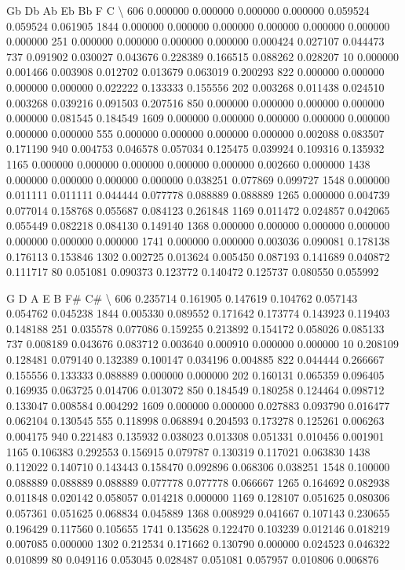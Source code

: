 \documentclass[letterpaper,10pt,english]{sphinxmanual}
\begin{document}
{\begin{sphinxVerbatim}[commandchars=\\\{\}]
            Gb        Db        Ab        Eb        Bb         F         C  \textbackslash{}
606   0.000000  0.000000  0.000000  0.000000  0.059524  0.059524  0.061905
1844  0.000000  0.000000  0.000000  0.000000  0.000000  0.000000  0.000000
251   0.000000  0.000000  0.000000  0.000000  0.000424  0.027107  0.044473
737   0.091902  0.030027  0.043676  0.228389  0.166515  0.088262  0.028207
10    0.000000  0.001466  0.003908  0.012702  0.013679  0.063019  0.200293
822   0.000000  0.000000  0.000000  0.000000  0.022222  0.133333  0.155556
202   0.003268  0.011438  0.024510  0.003268  0.039216  0.091503  0.207516
850   0.000000  0.000000  0.000000  0.000000  0.000000  0.081545  0.184549
1609  0.000000  0.000000  0.000000  0.000000  0.000000  0.000000  0.000000
555   0.000000  0.000000  0.000000  0.000000  0.002088  0.083507  0.171190
940   0.004753  0.046578  0.057034  0.125475  0.039924  0.109316  0.135932
1165  0.000000  0.000000  0.000000  0.000000  0.000000  0.002660  0.000000
1438  0.000000  0.000000  0.000000  0.000000  0.038251  0.077869  0.099727
1548  0.000000  0.011111  0.011111  0.044444  0.077778  0.088889  0.088889
1265  0.000000  0.004739  0.077014  0.158768  0.055687  0.084123  0.261848
1169  0.011472  0.024857  0.042065  0.055449  0.082218  0.084130  0.149140
1368  0.000000  0.000000  0.000000  0.000000  0.000000  0.000000  0.000000
1741  0.000000  0.000000  0.003036  0.090081  0.178138  0.176113  0.153846
1302  0.002725  0.013624  0.005450  0.087193  0.141689  0.040872  0.111717
80    0.051081  0.090373  0.123772  0.140472  0.125737  0.080550  0.055992

             G         D         A         E         B        F\#        C\#  \textbackslash{}
606   0.235714  0.161905  0.147619  0.104762  0.057143  0.054762  0.045238
1844  0.005330  0.089552  0.171642  0.173774  0.143923  0.119403  0.148188
251   0.035578  0.077086  0.159255  0.213892  0.154172  0.058026  0.085133
737   0.008189  0.043676  0.083712  0.003640  0.000910  0.000000  0.000000
10    0.208109  0.128481  0.079140  0.132389  0.100147  0.034196  0.004885
822   0.044444  0.266667  0.155556  0.133333  0.088889  0.000000  0.000000
202   0.160131  0.065359  0.096405  0.169935  0.063725  0.014706  0.013072
850   0.184549  0.180258  0.124464  0.098712  0.133047  0.008584  0.004292
1609  0.000000  0.000000  0.027883  0.093790  0.016477  0.062104  0.130545
555   0.118998  0.068894  0.204593  0.173278  0.125261  0.006263  0.004175
940   0.221483  0.135932  0.038023  0.013308  0.051331  0.010456  0.001901
1165  0.106383  0.292553  0.156915  0.079787  0.130319  0.117021  0.063830
1438  0.112022  0.140710  0.143443  0.158470  0.092896  0.068306  0.038251
1548  0.100000  0.088889  0.088889  0.088889  0.077778  0.077778  0.066667
1265  0.164692  0.082938  0.011848  0.020142  0.058057  0.014218  0.000000
1169  0.128107  0.051625  0.080306  0.057361  0.051625  0.068834  0.045889
1368  0.008929  0.041667  0.107143  0.230655  0.196429  0.117560  0.105655
1741  0.135628  0.122470  0.103239  0.012146  0.018219  0.007085  0.000000
1302  0.212534  0.171662  0.130790  0.000000  0.024523  0.046322  0.010899
80    0.049116  0.053045  0.028487  0.051081  0.057957  0.010806  0.006876


\end{sphinxVerbatim}}
\end{document}
